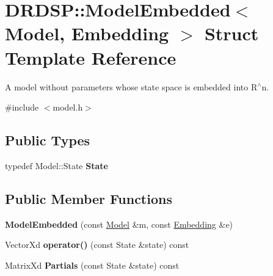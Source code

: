 \hypertarget{struct_d_r_d_s_p_1_1_model_embedded}{\section{D\-R\-D\-S\-P\-:\-:Model\-Embedded$<$ Model, Embedding $>$ Struct Template Reference}
\label{struct_d_r_d_s_p_1_1_model_embedded}
}


A model without parameters whose state space is embedded into R$^\wedge$n.  




{\ttfamily \#include $<$model.\-h$>$}

\subsection*{Public Types}
\begin{DoxyCompactItemize}
\item 
\hypertarget{struct_d_r_d_s_p_1_1_model_embedded_a73b0431c1e0415e54e821138654e7414}{typedef Model\-::\-State {\bfseries State}}\label{struct_d_r_d_s_p_1_1_model_embedded_a73b0431c1e0415e54e821138654e7414}

\end{DoxyCompactItemize}
\subsection*{Public Member Functions}
\begin{DoxyCompactItemize}
\item 
\hypertarget{struct_d_r_d_s_p_1_1_model_embedded_af20ae481d1c0f06921d5a3afc61e4925}{{\bfseries Model\-Embedded} (const \hyperlink{struct_d_r_d_s_p_1_1_model}{Model} \&m, const \hyperlink{struct_d_r_d_s_p_1_1_embedding}{Embedding} \&e)}\label{struct_d_r_d_s_p_1_1_model_embedded_af20ae481d1c0f06921d5a3afc61e4925}

\item 
\hypertarget{struct_d_r_d_s_p_1_1_model_embedded_a06fcd458e8e94ee5935df587b639be97}{Vector\-Xd {\bfseries operator()} (const State \&state) const }\label{struct_d_r_d_s_p_1_1_model_embedded_a06fcd458e8e94ee5935df587b639be97}

\item 
\hypertarget{struct_d_r_d_s_p_1_1_model_embedded_a8de87caf0f79a27021a122c9ff8bd54c}{Matrix\-Xd {\bfseries Partials} (const State \&state) const }\label{struct_d_r_d_s_p_1_1_model_embedded_a8de87caf0f79a27021a122c9ff8bd54c}

\end{DoxyCompactItemize}

